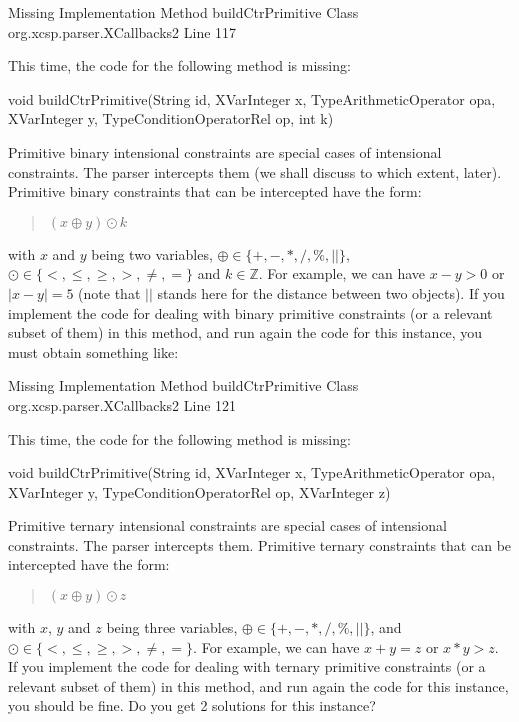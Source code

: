 \documentclass[10pt]{article}
\newenvironment{boxabsc}
               {\medskip \begin{bclogo}[barre=none,arrondi=0.2,logo=]{}\vspace{-0.6cm}}
               {\vspace{-0.1cm}\end{bclogo} \smallskip}
\begin{document}
\begin{boxabsc}
\begin{void}
Missing Implementation
  Method buildCtrPrimitive
  Class org.xcsp.parser.XCallbacks2
  Line 117
\end{void} 
\end{boxabsc}


This time, the code for the following method is missing:

\begin{boxabsc}
\begin{absc}
void buildCtrPrimitive(String id, XVarInteger x, TypeArithmeticOperator opa, XVarInteger y, TypeConditionOperatorRel op, int k) 		
\end{absc} 
\end{boxabsc}
 
Primitive binary intensional constraints are special cases of intensional constraints.
The parser intercepts them (we shall discuss to which extent, later).
Primitive binary constraints that can be intercepted have the form:
\begin{quote}
$(x \oplus y) \odot k$
\end{quote}
with $x$ and $y$ being two variables, $\oplus \in \{+,-,*,/,\%,||\}$, $\odot \in \{<,\leq,\geq,>,\neq,=\}$ and $k \in \mathbb{Z}$.
For example, we can have $x-y>0$ or $|x-y| = 5$ (note that $||$ stands here for the distance between two objects).
If you implement the code for dealing with binary primitive constraints (or a relevant subset of them) in this method, and run again the code for this instance, you must obtain something like:

\begin{boxabsc}
\begin{void}
Missing Implementation
  Method buildCtrPrimitive
  Class org.xcsp.parser.XCallbacks2
  Line 121
\end{void} 
\end{boxabsc}


This time, the code for the following method is missing:

\begin{boxabsc}
\begin{absc}
void buildCtrPrimitive(String id, XVarInteger x, TypeArithmeticOperator opa, XVarInteger y, TypeConditionOperatorRel op, XVarInteger z) 
\end{absc} 
\end{boxabsc}

Primitive ternary intensional constraints are special cases of intensional constraints.
The parser intercepts them.
Primitive ternary constraints that can be intercepted have the form:
\begin{quote}
$(x \oplus y) \odot z$
\end{quote}
with $x$, $y$ and $z$ being three variables, $\oplus \in \{+,-,*,/,\%,||\}$, and $\odot \in \{<,\leq,\geq,>,\neq,=\}$.
For example, we can have $x+y=z$ or $x*y > z$.
If you implement the code for dealing with ternary primitive constraints (or a relevant subset of them) in this method, and run again the code for this instance, you should be fine.
Do you get 2 solutions for this instance?
\end{document}
